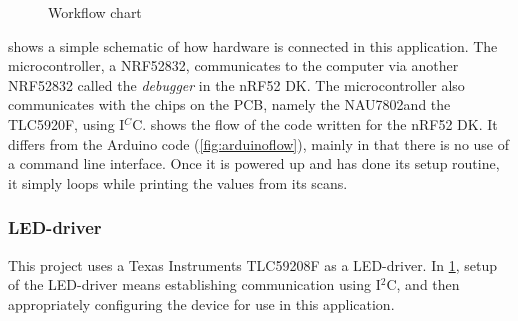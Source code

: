 \documentclass[12pt, a4paper]{article}
\begin{document}
            \begin{figure}
                \centering
                \vspace{-20pt}
                \caption{Workflow chart}
                \label{fig:workflow}
            \end{figure}
            
             shows a simple schematic of how hardware is connected in this application. The microcontroller, a NRF52832,
            communicates to the computer via another NRF52832 called the \textit{debugger} in the nRF52 DK. The microcontroller also communicates with
            the chips on the PCB, namely the NAU7802and the TLC5920F, using I$^C$C.
             shows the flow of the code written for the nRF52 DK. It differs from the Arduino code (\cref{fig:arduinoflow}),
            mainly in that there is no use of a command line interface. Once it is powered up and has done its setup routine, it simply loops
            while printing the values from its scans.

            \subsubsection{LED-driver}
                This project uses a Texas Instruments TLC59208F as a LED-driver. In \cref{fig:workflow}, setup of the LED-driver means establishing communication
                using I$^2$C, and then appropriately configuring the device for use in this application.
            
\end{document}

